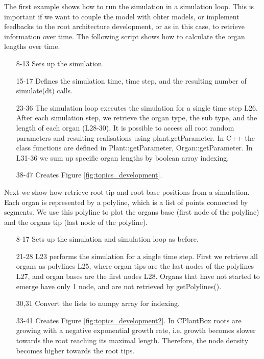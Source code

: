 The first example shows how to run the simulation in a simulation loop. This is important if we want to couple the model with ohter models, or implement feedbacks to the root architecture development, or as in this case, to retrieve information over time. The following script shows how to calculate the organ lengths over time. 



\begin{itemize}
\item[8-13] Sets up the simulation.
\item[15-17] Defines the simulation time, time step, and the resulting number of simulate(dt) calls. 
\item[23-36] The simulation loop executes the simulation for a single time step L26. After each simulation step, we retrieve the organ type, the sub type, and the length of each organ (L28-30). It is possible to access all root random parameters and resulting realisations using plant.getParameter. In C++ the class functions are defined in Plant::getParameter, Organ::getParameter. In L31-36 we sum up specific organ lengths by boolean array indexing.
\item[38-47] Creates Figure \ref{fig:topics_development}.
\end{itemize}

Next we show how retrieve root tip and root base positions from a simulation. Each organ is represented by a polyline, which is a list of points connected by segments. We use this polyline to plot the organs base (first node of the polyline) and the organs tip (last node of the polyline). 



\begin{itemize}

\item[8-17] Sets up the simulation and simulation loop as before.
\item[21-28] L23 performs the simulation for a single time step. First we retrieve all organs as polylines L25, where organ tips are the last nodes of the polylines L27, and organ bases are the first nodes L28. Organs that have not started to emerge have only 1 node, and are not retrieved by getPolylines().
\item[30,31] Convert the lists to numpy array for indexing.
\item[33-41] Creates Figure \ref{fig:topics_development2}. In CPlantBox roots are growing with a negative exponential growth rate, i.e. growth becomes slower towards the root reaching its maximal length. Therefore, the node density becomes higher towards the root tips. 
\end{itemize}

